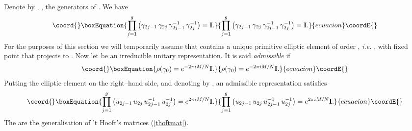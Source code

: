 \documentclass[a4paper,a4paper]{article}
\begin{document}
Denote by \coordHE{}, \coordHE{}, the generators of \myHighlight{$\Gamma$}\coordHE{}. We have
\begin{equation}\coord{}\boxEquation{  
\prod_{j=1}^g \left(\gamma_{2j-1}\,\gamma_{2j}\,
\gamma_{2j-1}^{-1}\, \gamma_{2j}^{-1}\right)={\bf I}.  
\label{genex}  
}{  
\prod_{j=1}^g \left(\gamma_{2j-1}\,\gamma_{2j}\,
\gamma_{2j-1}^{-1}\, \gamma_{2j}^{-1}\right)={\bf I}.  
}{ecuacion}\coordE{}\end{equation}
For the purposes of this section we will temporarily assume that  
\myHighlight{$\Gamma$}\coordHE{} contains a unique primitive elliptic element \coordHE{} of 
order \coordHE{}, {\it i.e.} \coordHE{}, with fixed point \coordHE{} that projects to \coordHE{}. Now let \coordHE{} 
be an irreducible unitary representation. It is said  {\it admissible} if  
\begin{equation}\coord{}\boxEquation{  
\rho(\gamma_0)=e^{-2\pi i M/N}{{\bf  I}}.  
\label{ammissibile}
}{  
\rho(\gamma_0)=e^{-2\pi i M/N}{{\bf  I}}.  
}{ecuacion}\coordE{}\end{equation}  
Putting the elliptic element on the right--hand side, and denoting  
\coordHE{} by  \coordHE{}, an admissible representation satisfies  
\begin{equation}\coord{}\boxEquation{  
\prod_{j=1}^g \left(u_{2j-1}\,u_{2j}\,u_{2j-1}^{-1}\, u_{2j}^{-1}\right)=  
e^{2\pi iM/N}{{\bf  I}}.  
\label{nsmatrices}
}{  
\prod_{j=1}^g \left(u_{2j-1}\,u_{2j}\,u_{2j-1}^{-1}\, u_{2j}^{-1}\right)=  
e^{2\pi iM/N}{{\bf  I}}.  
}{ecuacion}\coordE{}\end{equation}  
The \coordHE{} are the \coordHE{} generalisation of 't Hooft's matrices (\ref{thoftmat}).  
  
\end{document}
